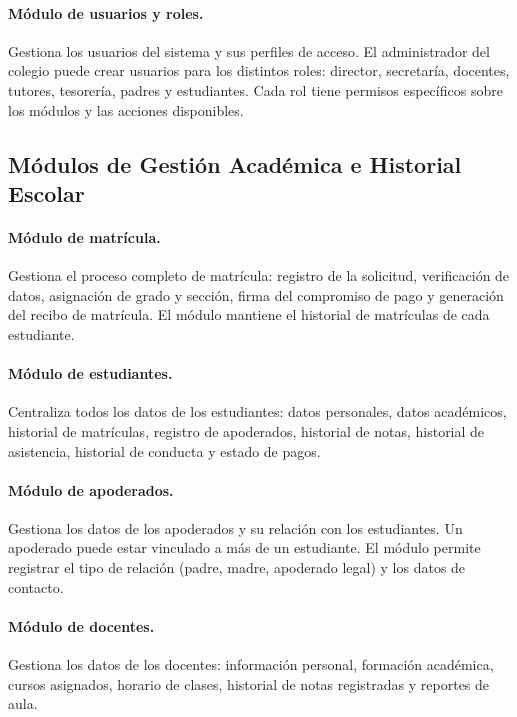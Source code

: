 \documentclass[12pt,a4paper,oneside]{report}
\begin{document}
\paragraph{Módulo de usuarios y roles.} Gestiona los usuarios del sistema y sus perfiles de acceso. El administrador del colegio puede crear usuarios para los distintos roles: director, secretaría, docentes, tutores, tesorería, padres y estudiantes. Cada rol tiene permisos específicos sobre los módulos y las acciones disponibles.

\subsection{Módulos de Gestión Académica e Historial Escolar}

\paragraph{Módulo de matrícula.} Gestiona el proceso completo de matrícula: registro de la solicitud, verificación de datos, asignación de grado y sección, firma del compromiso de pago y generación del recibo de matrícula. El módulo mantiene el historial de matrículas de cada estudiante.

\paragraph{Módulo de estudiantes.} Centraliza todos los datos de los estudiantes: datos personales, datos académicos, historial de matrículas, registro de apoderados, historial de notas, historial de asistencia, historial de conducta y estado de pagos.

\paragraph{Módulo de apoderados.} Gestiona los datos de los apoderados y su relación con los estudiantes. Un apoderado puede estar vinculado a más de un estudiante. El módulo permite registrar el tipo de relación (padre, madre, apoderado legal) y los datos de contacto.

\paragraph{Módulo de docentes.} Gestiona los datos de los docentes: información personal, formación académica, cursos asignados, horario de clases, historial de notas registradas y reportes de aula.
\end{document}
